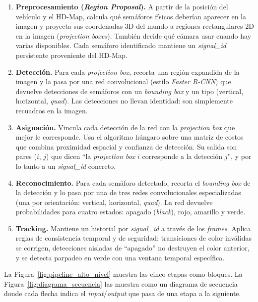 \begin{enumerate}
    \item \textbf{Preprocesamiento (\textit{Region Proposal}).} A partir de la posición del vehículo y el HD-Map, calcula qué semáforos físicos deberían aparecer en la imagen y proyecta sus coordenadas 3D del mundo a regiones rectangulares 2D en la imagen (\textit{projection boxes}). También decide qué cámara usar cuando hay varias disponibles. Cada semáforo identificado mantiene un \textit{signal\_id} persistente proveniente del HD-Map.

    \item \textbf{Detección.} Para cada \textit{projection box}, recorta una región expandida de la imagen y la pasa por una red convolucional (estilo \textit{Faster R-CNN}) que devuelve detecciones de semáforos con un \textit{bounding box} y un tipo (vertical, horizontal, \textit{quad}). Las detecciones no llevan identidad: son simplemente recuadros en la imagen.

    \item \textbf{Asignación.} Vincula cada detección de la red con la \textit{projection box} que mejor le corresponde. Usa el algoritmo húngaro sobre una matriz de costos que combina proximidad espacial y confianza de detección. Su salida son pares ($i$, $j$) que dicen ``la \textit{projection box} $i$ corresponde a la detección $j$'', y por lo tanto a un \textit{signal\_id} concreto.

    \item \textbf{Reconocimiento.} Para cada semáforo detectado, recorta el \textit{bounding box} de la detección y lo pasa por una de tres redes convolucionales especializadas (una por orientación: vertical, horizontal, \textit{quad}). La red devuelve probabilidades para cuatro estados: apagado (\textit{black}), rojo, amarillo y verde.

    \item \textbf{Tracking.} Mantiene un historial por \textit{signal\_id} a través de los \textit{frames}. Aplica reglas de consistencia temporal y de seguridad: transiciones de color inválidas se corrigen, detecciones aisladas de ``apagado'' no destruyen el color anterior, y se detecta parpadeo en verde con una ventana temporal específica.
\end{enumerate}

La Figura~\ref{fig:pipeline_alto_nivel} muestra las cinco etapas como bloques. La Figura~\ref{fig:diagrama_secuencia} las muestra como un diagrama de secuencia donde cada flecha indica el \textit{input}/\textit{output} que pasa de una etapa a la siguiente.

